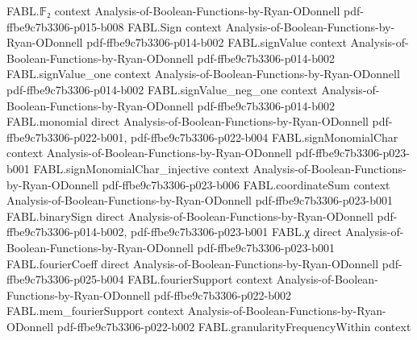 \begin{theorem}
\leanok
{}
\proofstep
  {FABL.𝔽₂}
  {context}
  {Analysis-of-Boolean-Functions-by-Ryan-ODonnell}
  {pdf-ffbe9c7b3306-p015-b008}
\proofstep
  {FABL.Sign}
  {context}
  {Analysis-of-Boolean-Functions-by-Ryan-ODonnell}
  {pdf-ffbe9c7b3306-p014-b002}
\proofstep
  {FABL.signValue}
  {context}
  {Analysis-of-Boolean-Functions-by-Ryan-ODonnell}
  {pdf-ffbe9c7b3306-p014-b002}
\proofstep
  {FABL.signValue_one}
  {context}
  {Analysis-of-Boolean-Functions-by-Ryan-ODonnell}
  {pdf-ffbe9c7b3306-p014-b002}
\proofstep
  {FABL.signValue_neg_one}
  {context}
  {Analysis-of-Boolean-Functions-by-Ryan-ODonnell}
  {pdf-ffbe9c7b3306-p014-b002}
\proofstep
  {FABL.monomial}
  {direct}
  {Analysis-of-Boolean-Functions-by-Ryan-ODonnell}
  {pdf-ffbe9c7b3306-p022-b001,
    pdf-ffbe9c7b3306-p022-b004}
\proofstep
  {FABL.signMonomialChar}
  {context}
  {Analysis-of-Boolean-Functions-by-Ryan-ODonnell}
  {pdf-ffbe9c7b3306-p023-b001}
\proofstep
  {FABL.signMonomialChar_injective}
  {context}
  {Analysis-of-Boolean-Functions-by-Ryan-ODonnell}
  {pdf-ffbe9c7b3306-p023-b006}
\proofstep
  {FABL.coordinateSum}
  {context}
  {Analysis-of-Boolean-Functions-by-Ryan-ODonnell}
  {pdf-ffbe9c7b3306-p023-b001}
\proofstep
  {FABL.binarySign}
  {direct}
  {Analysis-of-Boolean-Functions-by-Ryan-ODonnell}
  {pdf-ffbe9c7b3306-p014-b002,
    pdf-ffbe9c7b3306-p023-b001}
\proofstep
  {FABL.χ}
  {direct}
  {Analysis-of-Boolean-Functions-by-Ryan-ODonnell}
  {pdf-ffbe9c7b3306-p023-b001}
\proofstep
  {FABL.fourierCoeff}
  {direct}
  {Analysis-of-Boolean-Functions-by-Ryan-ODonnell}
  {pdf-ffbe9c7b3306-p025-b004}
\proofstep
  {FABL.fourierSupport}
  {context}
  {Analysis-of-Boolean-Functions-by-Ryan-ODonnell}
  {pdf-ffbe9c7b3306-p022-b002}
\proofstep
  {FABL.mem_fourierSupport}
  {context}
  {Analysis-of-Boolean-Functions-by-Ryan-ODonnell}
  {pdf-ffbe9c7b3306-p022-b002}
\proofstep
  {FABL.granularityFrequencyWithin}
  {context}

\end{theorem}

